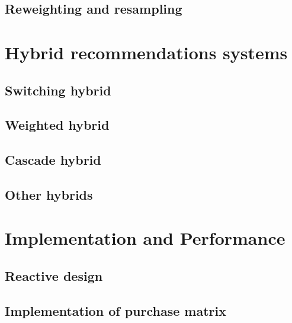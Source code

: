 \documentclass[10pt]{reportMaster}
\begin{document}
\section{Reweighting and resampling}



\chapter{Hybrid recommendations systems}

\section{Switching hybrid}

\section{Weighted hybrid}

\section{Cascade hybrid}

\section{Other hybrids}



\chapter{Implementation and Performance}

\section{Reactive design}

\section{Implementation of purchase matrix}
\end{document}
